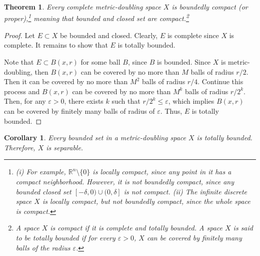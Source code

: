 \documentclass[11pt]{book}
\newtheorem{theorem}{Theorem}[chapter]
\newtheorem{corollary}{Corollary}[theorem]
\theoremstyle{definition}
\numberwithin{equation}{chapter}
\begin{document}
\begin{theorem}
Every complete metric-doubling space $X$ is boundedly compact (or proper),\footnote{(i) For example, $\mathbb{R}^n \setminus \{0\}$ is locally compact, since any point in it has a compact neighborhood. However, it is not boundedly compact, since any bounded closed set $[-\delta,0)\cup(0,\delta]$ is not compact. (ii) The infinite discrete space $X$ is locally compact, but not 
boundedly compact, since the whole space is compact.} meaning that bounded and closed set are compact.\footnote{A space $X$ is compact if it is complete and totally bounded. A space $X$ is said to be totally bounded if for every $\varepsilon > 0$, $X$ can be covered by finitely many balls of the radius $\varepsilon$.}
\end{theorem}
\begin{proof}
Let $E \subset X$ be bounded and closed. Clearly, $E$ is complete since $X$ is complete. It remains to show that $E$ is totally bounded.

Note that $E \subset B(x,r)$ for some ball $B$, since $B$ is bounded. Since $X$ is metric-doubling, then $B(x,r)$ can be covered by no more than $M$ balls of radius $r/2$. Then it can be covered by no more than $M^2$ balls of radius $r/4$. Continue this process and $B(x,r)$ can be covered by no more than $M^k$ balls of radius $r/2^k$. Then, for any $\varepsilon > 0$, there exists $k$ such that $r/2^k \leq \varepsilon$, which implies $B(x,r)$ can be covered by finitely many balls of radius of $\varepsilon$. Thus, $E$ is totally bounded.
\end{proof}

\medskip

\begin{corollary}\label{coro_511}
Every bounded set in a metric-doubling space $X$ is totally bounded. Therefore, $X$ is separable.
\end{corollary}

\medskip
\end{document}
